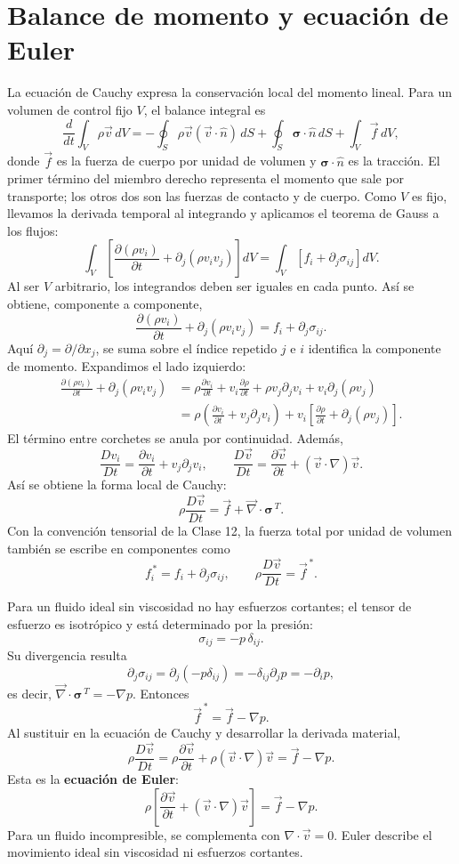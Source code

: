 \section{Balance de momento y ecuación de Euler}

La ecuación de Cauchy expresa la conservación local del momento lineal. Para un volumen de control fijo $V$, el balance integral es
\[
\frac{d}{dt}\int_V\rho\vec v\,dV
=-\oint_S\rho\vec v(\vec v\cdot\hat n)\,dS
+\oint_S\boldsymbol{\sigma}\cdot\hat n\,dS
+\int_V\vec f\,dV,
\]
donde $\vec f$ es la fuerza de cuerpo por unidad de volumen y $\boldsymbol{\sigma}\cdot\hat n$ es la tracción. El primer término del miembro derecho representa el momento que sale por transporte; los otros dos son las fuerzas de contacto y de cuerpo. Como $V$ es fijo, llevamos la derivada temporal al integrando y aplicamos el teorema de Gauss a los flujos:
\[
\int_V\left[\frac{\partial(\rho v_i)}{\partial t}+\partial_j(\rho v_i v_j)\right]dV
=\int_V\left[f_i+\partial_j\sigma_{ij}\right]dV.
\]
Al ser $V$ arbitrario, los integrandos deben ser iguales en cada punto. Así se obtiene, componente a componente,
\[
\frac{\partial(\rho v_i)}{\partial t}
+\partial_j(\rho v_i v_j)
=f_i+\partial_j\sigma_{ij}.
\]
Aquí $\partial_j=\partial/\partial x_j$, se suma sobre el índice repetido $j$ e $i$ identifica la componente de momento. Expandimos el lado izquierdo:
\[
\begin{aligned}
\frac{\partial(\rho v_i)}{\partial t}
+\partial_j(\rho v_i v_j)
&=\rho\frac{\partial v_i}{\partial t}
+v_i\frac{\partial\rho}{\partial t}
+\rho v_j\partial_jv_i
+v_i\partial_j(\rho v_j)\\
&=\rho\left(\frac{\partial v_i}{\partial t}
+v_j\partial_jv_i\right)
+v_i\left[\frac{\partial\rho}{\partial t}
+\partial_j(\rho v_j)\right].
\end{aligned}
\]
El término entre corchetes se anula por continuidad. Además,
\[
\frac{Dv_i}{Dt}
=\frac{\partial v_i}{\partial t}+v_j\partial_jv_i,
\qquad
\frac{D\vec v}{Dt}
=\frac{\partial\vec v}{\partial t}
+(\vec v\cdot\nabla)\vec v.
\]
Así se obtiene la forma local de Cauchy:
\[
\boxed{\rho\frac{D\vec v}{Dt}
=\vec f+\vec\nabla\cdot\boldsymbol{\sigma}^{\,T}.}
\]
Con la convención tensorial de la Clase 12, la fuerza total por unidad de volumen también se escribe en componentes como
\[
f_i^{\,*}=f_i+\partial_j\sigma_{ij},
\qquad
\rho\frac{D\vec v}{Dt}=\vec f^{\,*}.
\]

Para un fluido ideal sin viscosidad no hay esfuerzos cortantes; el tensor de esfuerzo es isotrópico y está determinado por la presión:
\[
\sigma_{ij}=-p\,\delta_{ij}.
\]
Su divergencia resulta
\[
\partial_j\sigma_{ij}
=\partial_j(-p\delta_{ij})
=-\delta_{ij}\partial_jp
=-\partial_i p,
\]
es decir, $\vec\nabla\cdot\boldsymbol{\sigma}^{\,T}=-\nabla p$. Entonces
\[
\vec f^{\,*}=\vec f-\nabla p.
\]
Al sustituir en la ecuación de Cauchy y desarrollar la derivada material,
\[
\rho\frac{D\vec v}{Dt}
=\rho\frac{\partial\vec v}{\partial t}
+\rho(\vec v\cdot\nabla)\vec v
=\vec f-\nabla p.
\]
Esta es la \textbf{ecuación de Euler}:
\[
\boxed{\rho\left[
\frac{\partial\vec v}{\partial t}
+(\vec v\cdot\nabla)\vec v\right]
=\vec f-\nabla p.}
\]
Para un fluido incompresible, se complementa con $\nabla\cdot\vec v=0$. Euler describe el movimiento ideal sin viscosidad ni esfuerzos cortantes.

